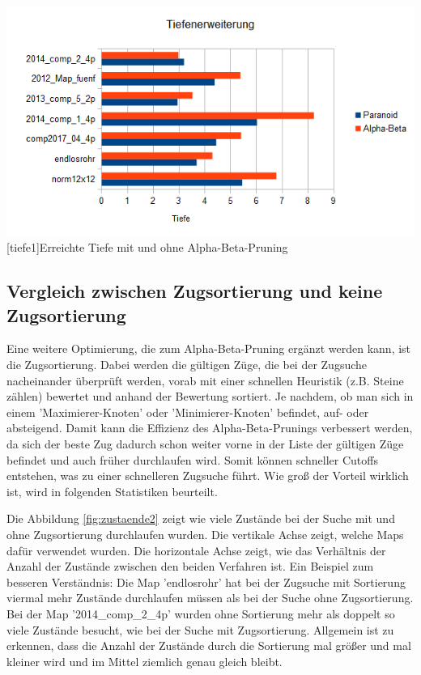 \documentclass[12pt,a4paper,bibliography=totocnumbered,listof=totocnumbered]{scrartcl}
\begin{document}
	 \vspace{1em}
	 \begin{minipage}{\linewidth}
	 	\centering
	 	\includegraphics[width=1\linewidth]{pics/Kapitel_4/TiefeParaAlpha.png}
	 	[tiefe1]{Erreichte Tiefe mit und ohne Alpha-Beta-Pruning}
	 	\label{fig:tiefe1}
	 \end{minipage}
	 \vspace{1em}

	\newpage

    \subsection{Vergleich zwischen Zugsortierung und keine Zugsortierung}
    \vspace{1em}
    
    Eine weitere Optimierung, die zum Alpha-Beta-Pruning ergänzt werden kann, ist die Zugsortierung. Dabei werden die gültigen Züge, die bei der Zugsuche nacheinander überprüft werden, vorab mit einer schnellen Heuristik (z.B. Steine zählen) bewertet und anhand der Bewertung sortiert. Je nachdem, ob man sich in einem 'Maximierer-Knoten' oder 'Minimierer-Knoten' befindet, auf- oder absteigend. Damit kann die Effizienz des Alpha-Beta-Prunings verbessert werden, da sich der beste Zug dadurch schon weiter vorne in der Liste der gültigen Züge befindet und auch früher durchlaufen wird. Somit können schneller Cutoffs entstehen, was zu einer schnelleren Zugsuche führt. Wie groß der Vorteil wirklich ist, wird in folgenden Statistiken beurteilt.
    
    Die Abbildung \ref{fig:zustaende2} zeigt wie viele Zustände bei der Suche mit und ohne Zugsortierung durchlaufen wurden. Die vertikale Achse zeigt, welche Maps dafür verwendet wurden. Die horizontale Achse zeigt, wie das Verhältnis der Anzahl der Zustände zwischen den beiden Verfahren ist. Ein Beispiel zum besseren Verständnis:\newline
    Die Map 'endlosrohr' hat bei der Zugsuche mit Sortierung viermal mehr Zustände durchlaufen müssen als bei der Suche ohne Zugsortierung.\newline
    Bei der Map '2014\_comp\_2\_4p' wurden ohne Sortierung mehr als doppelt so viele Zustände besucht, wie bei der Suche mit Zugsortierung.\newline
    Allgemein ist zu erkennen, dass die Anzahl der Zustände durch die Sortierung mal größer und mal kleiner wird und im Mittel ziemlich genau gleich bleibt.
    
\end{document}
